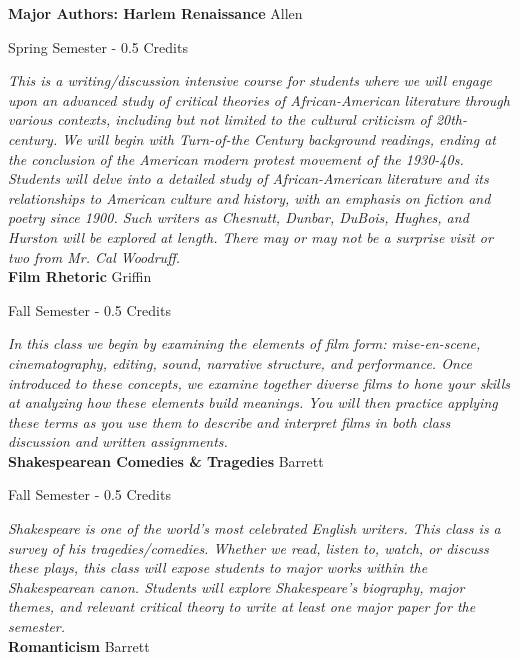 \noindent\textbf{Major Authors: Harlem Renaissance} \hfill Allen

\noindent Spring Semester - 0.5 Credits

\vspace{1mm}\emph{This is a writing/discussion intensive course for students where we will engage upon an advanced study of critical theories of African-American literature through various contexts, including but not limited to the cultural criticism of 20th-century. We will begin with Turn-of-the Century background readings, ending at the conclusion of the American modern protest movement of the 1930-40s. Students will delve into a detailed study of African-American literature and its relationships to American culture and history, with an emphasis on fiction and poetry since 1900. Such writers as Chesnutt, Dunbar, DuBois, Hughes, and Hurston will be explored at length. There may or may not be a surprise visit or two from Mr. Cal Woodruff.}\\


\noindent\textbf{Film Rhetoric} \hfill Griffin

\noindent Fall Semester - 0.5 Credits

\vspace{1mm}\emph{In this class we begin by examining the elements of film form: mise-en-scene, cinematography, editing, sound, narrative structure, and performance. Once introduced to these concepts, we examine together diverse films to hone your skills at analyzing how these elements build meanings. You will then practice applying these terms as you use them to describe and interpret films in both class discussion and written assignments.}\\


\noindent\textbf{Shakespearean Comedies \& Tragedies} \hfill Barrett

\noindent Fall Semester - 0.5 Credits

\vspace{1mm}\emph{Shakespeare is one of the world's most celebrated English writers.  This class is a survey of his tragedies/comedies.  Whether we read, listen to, watch, or discuss these plays, this class will expose students to major works within the Shakespearean canon.  Students will explore Shakespeare's biography, major themes, and relevant critical theory to write at least one major paper for the semester. }\\


\noindent\textbf{Romanticism} \hfill Barrett

